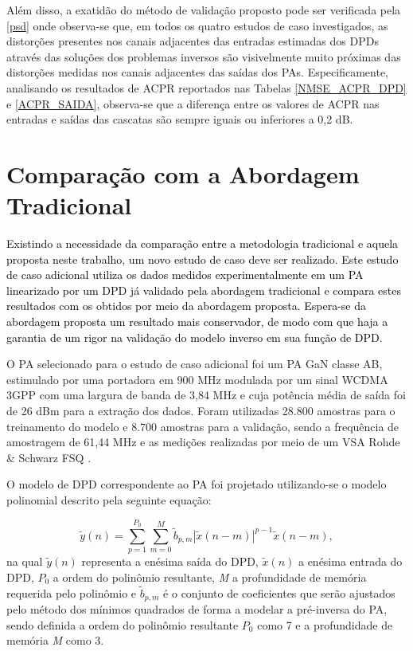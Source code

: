 {Além disso, a exatidão do método de validação proposto pode ser verificada pela \autoref{psd} onde observa-se que, em todos os quatro estudos de caso investigados, as distorções presentes nos canais adjacentes das entradas estimadas dos DPDs através das soluções dos problemas inversos são visivelmente muito próximas das distorções medidas nos canais adjacentes das saídas dos PAs. Especificamente, analisando os resultados de ACPR reportados nas Tabelas \ref{NMSE_ACPR_DPD} e \ref{ACPR_SAIDA}, observa-se que a diferença entre os valores de ACPR nas entradas e saídas das cascatas são sempre iguais ou inferiores a 0,2 dB.}

 {\setlength{\parindent}{0cm}}


\section{Comparação com a Abordagem Tradicional}

\textcolor{black}{Existindo a necessidade da comparação entre a metodologia tradicional e aquela proposta neste trabalho, um novo estudo de caso deve ser realizado. Este estudo de caso adicional utiliza os dados medidos experimentalmente em um PA linearizado por um DPD já validado pela abordagem tradicional e compara estes resultados com os obtidos por meio da abordagem proposta. Espera-se da abordagem proposta um resultado mais conservador, de modo com que haja a garantia de um rigor na validação do modelo inverso em sua função de DPD.}

{O PA selecionado para o estudo de caso adicional foi um PA GaN classe AB, estimulado por uma portadora em 900 MHz modulada por um sinal WCDMA 3GPP com uma largura de banda de 3,84 MHz e cuja potência média de saída foi de 26 dBm para a extração dos dados. Foram utilizadas 28.800 amostras para o treinamento do modelo e 8.700 amostras para a validação, sendo a frequência de amostragem de 61,44 MHz e as medições realizadas por meio de um VSA Rohde \& Schwarz FSQ \cite{lima2009rfpa}.}

{O modelo de DPD correspondente ao PA foi projetado utilizando-se o modelo polinomial descrito pela seguinte equação:}

\begin{equation}
\tilde{y}(n) = \sum\limits_{p=1}^{P_0} \sum\limits_{m=0}^{M}\tilde{b}_{p,m}|\tilde{x}(n-m)|^{p-1}\tilde{x}(n-m),
\label{dpdcomp}
\end{equation}
{na qual $\tilde{y}(n)$ representa a enésima saída do DPD, $\tilde{x}(n)$ a enésima entrada do DPD, $P_{0}$ a ordem do polinômio resultante, \textit{M} a profundidade de memória requerida pelo polinômio e $\tilde{b}_{p,m}$ é o conjunto de coeficientes que serão ajustados pelo método dos mínimos quadrados de forma a modelar a pré-inversa do PA, sendo definida a ordem do polinômio resultante $P_{0}$ como 7 e a profundidade de memória \textit{M} como 3.}

